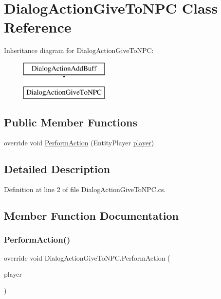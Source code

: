 \hypertarget{class_dialog_action_give_to_n_p_c}{}\section{Dialog\+Action\+Give\+To\+N\+PC Class Reference}
\label{class_dialog_action_give_to_n_p_c}
Inheritance diagram for Dialog\+Action\+Give\+To\+N\+PC\+:\begin{figure}[H]
\begin{center}
\leavevmode
\includegraphics[height=2.000000cm]{class_dialog_action_give_to_n_p_c}
\end{center}
\end{figure}
\subsection*{Public Member Functions}
\begin{DoxyCompactItemize}
\item 
override void \mbox{\hyperlink{class_dialog_action_give_to_n_p_c_aad753ab451ee750a6f3d147bf5d94f1f}{Perform\+Action}} (Entity\+Player \mbox{\hyperlink{_sphere_i_i_01_music_01_boxes_2_config_2_localization_8txt_a4e2cb8aeff651600ea1cc57fe5a929a4}{player}})
\end{DoxyCompactItemize}


\subsection{Detailed Description}


Definition at line 2 of file Dialog\+Action\+Give\+To\+N\+P\+C.\+cs.



\subsection{Member Function Documentation}
\mbox{\label{class_dialog_action_give_to_n_p_c_aad753ab451ee750a6f3d147bf5d94f1f}} 
\subsubsection{\texorpdfstring{PerformAction()}{PerformAction()}}
{\footnotesize\ttfamily override void Dialog\+Action\+Give\+To\+N\+P\+C.\+Perform\+Action (\begin{DoxyParamCaption}\item[{Entity\+Player}]{player }\end{DoxyParamCaption})}



